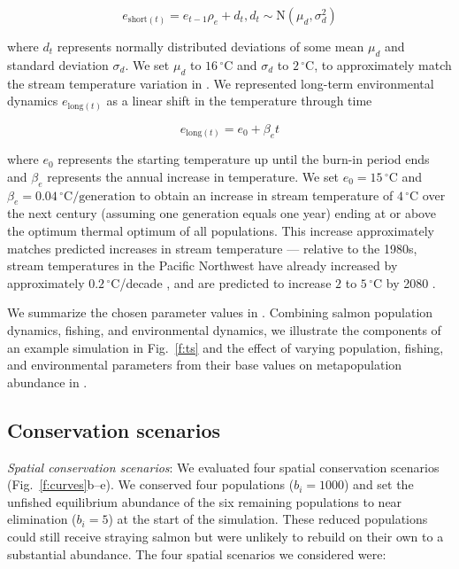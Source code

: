 \[e_{\mathrm{short}(t)} = e_{t-1} \rho_e + d_t, d_t \sim \mathrm{N}(\mu_d, \sigma_d^2)\]

\noindent
where $d_t$ represents normally distributed deviations of some mean $\mu_d$ and standard deviation $\sigma_d$. We set $\mu_d$ to $16\,^{\circ}\mathrm{C}$ and $\sigma_d$ to $2\,^{\circ}\mathrm{C}$, to approximately match the stream temperature variation in \citet{eliason2011}. We represented long-term environmental dynamics $e_{\mathrm{long}(t)}$ as a linear shift in the temperature through time

\[e_{\mathrm{long}(t)} = e_0 + \beta_e t\]

\noindent
where $e_0$ represents the starting temperature up until the burn-in period ends and $\beta_e$ represents the annual increase in temperature. We set $e_0 = 15\,^{\circ}\mathrm{C}$ and $\beta_e = 0.04\,^{\circ}\mathrm{C} / \mathrm{generation}$ to obtain an increase in stream temperature of $4\,^{\circ}\mathrm{C}$ over the next century (assuming one generation equals one year) ending at or above the optimum thermal optimum of all populations. This increase approximately matches predicted increases in stream temperature --- relative to the 1980s, stream temperatures in the Pacific Northwest have already increased by approximately $0.2\,^{\circ}\mathrm{C}$/decade \citep{isaak2012}, and are predicted to increase $2$ to $5\,^{\circ}\mathrm{C}$ by 2080 \citep{mantua2010}.

We summarize the chosen parameter values in \somparam. Combining salmon population dynamics, fishing, and environmental dynamics, we illustrate the components of an example simulation in Fig.~\ref{f:ts} and the effect of varying population, fishing, and environmental parameters from their base values on metapopulation abundance in \somsens.

\subsection{Conservation scenarios}\label{conservation-scenarios}

\emph{Spatial conservation scenarios}: We evaluated four spatial conservation scenarios (Fig.~\ref{f:curves}b--e). We conserved four populations ($b_i = 1000$) and set the unfished equilibrium abundance of the six remaining populations to near elimination ($b_i = 5$) at the start of the simulation. These reduced populations could still receive straying salmon but were unlikely to rebuild on their own to a substantial abundance. The four spatial scenarios we considered were:

